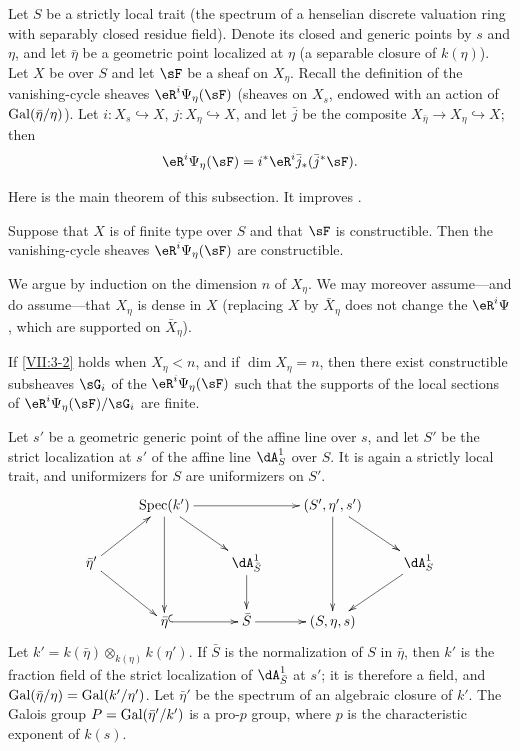 Let $S$ be a strictly local trait (the spectrum of a henselian discrete
valuation ring with separably closed residue field). Denote its closed and
generic points by $s$ and $\eta$, and let $\bar\eta$ be a geometric point
localized at $\eta$ (a separable closure of $k(\eta)$). Let $X$ be over $S$
and let $\sF$ be a sheaf on $X_\eta$. Recall the definition of the
vanishing-cycle sheaves $\eR^i \Psi_\eta(\sF)$ (sheaves on $X_s$, endowed with
an action of $\operatorname{Gal}(\bar\eta/\eta)$). Let $i:X_s\hookrightarrow X$,
$j:X_\eta \hookrightarrow X$, and let $\bar j$ be the composite
$X_{\bar\eta}\to X_\eta \hookrightarrow X$; then
\[
  \eR^i \Psi_\eta(\sF) = i^\ast \eR^i \bar j_\ast (\bar j^\ast \sF) \text{.} 
\]

Here is the main theorem of this subsection. It improves
\cite[XIII 2.3.1, 2.4.2]{sga7}.






\begin{theorem_}\label{VII:3-2}
Suppose that $X$ is of finite type over $S$ and that $\sF$ is constructible.
Then the vanishing-cycle sheaves $\eR^i \Psi_\eta(\sF)$ are constructible.
\end{theorem_}

We argue by induction on the dimension $n$ of $X_\eta$. We may moreover
assume---and do assume---that $X_\eta$ is dense in $X$ (replacing $X$ by
$\bar X_\eta$ does not change the $\eR^i \Psi$, which are supported on
$\bar X_\eta$).






\begin{lemma_}\label{VII:3-3}
If \ref{VII:3-2} holds when $X_\eta<n$, and if
$\dim X_\eta=n$, then there exist constructible subsheaves $\sG_i$ of the
$\eR^i \Psi_\eta(\sF)$ such that the supports of the local sections of
$\eR^i\Psi_\eta(\sF)/\sG_i$ are finite.
\end{lemma_}

Let $s'$ be a geometric generic point of the affine line over $s$, and let
$S'$ be the strict localization at $s'$ of the affine line $\dA_S^1$ over
$S$. It is again a strictly local trait, and uniformizers for $S$ are
uniformizers on $S'$.
\[\xymatrix{
  & \spec(k') \ar[rr] \ar[dd] \ar[dr] 
    & & (S',\eta',s') \ar[dr] \ar[dd] \\
  \bar\eta' \ar[ur] \ar[dr] 
    & & \dA_{\bar S}^1 \ar[d]  
    & & \dA_S^1 \ar[dl] \\
  & \bar\eta\ar@{^{(}->}[r] 
    & \bar S \ar[r] 
    & (S,\eta,s) 
}\]
Let $k'=k(\bar\eta)\otimes_{k(\eta)}k(\eta')$. If $\bar S$ is the
normalization of $S$ in $\bar\eta$, then $k'$ is the fraction field of the
strict localization of $\dA_{\bar S}^1$ at $s'$; it is therefore a field, and
$\operatorname{Gal}(\bar\eta/\eta)=\operatorname{Gal}(k'/\eta')$. Let $\bar\eta'$ be the spectrum of an
algebraic closure of $k'$. The Galois group $P=\operatorname{Gal}(\bar\eta'/k')$ is a
pro-$p$ group, where $p$ is the characteristic exponent of $k(s)$.







